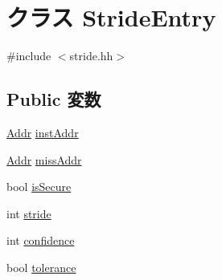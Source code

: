 \hypertarget{classStridePrefetcher_1_1StrideEntry}{
\section{クラス StrideEntry}
\label{classStridePrefetcher_1_1StrideEntry}
}


{\ttfamily \#include $<$stride.hh$>$}\subsection*{Public 変数}
\begin{DoxyCompactItemize}
\item 
\hyperlink{base_2types_8hh_af1bb03d6a4ee096394a6749f0a169232}{Addr} \hyperlink{classStridePrefetcher_1_1StrideEntry_a74644dd5141809426a7e8c4532b21bc6}{instAddr}
\item 
\hyperlink{base_2types_8hh_af1bb03d6a4ee096394a6749f0a169232}{Addr} \hyperlink{classStridePrefetcher_1_1StrideEntry_a826551081fa5bb40dc1f49998fa6cbf3}{missAddr}
\item 
bool \hyperlink{classStridePrefetcher_1_1StrideEntry_a62bc84f4251f16cf0cfa0f8d96e00c37}{isSecure}
\item 
int \hyperlink{classStridePrefetcher_1_1StrideEntry_a08f66a6870d87afcd5dc1b60d1019692}{stride}
\item 
int \hyperlink{classStridePrefetcher_1_1StrideEntry_a1a5d876387ec0f17dc6df2e0dbe707b2}{confidence}
\item 
bool \hyperlink{classStridePrefetcher_1_1StrideEntry_ad7b67aab6ee10950af554504c633f84b}{tolerance}
\end{DoxyCompactItemize}


